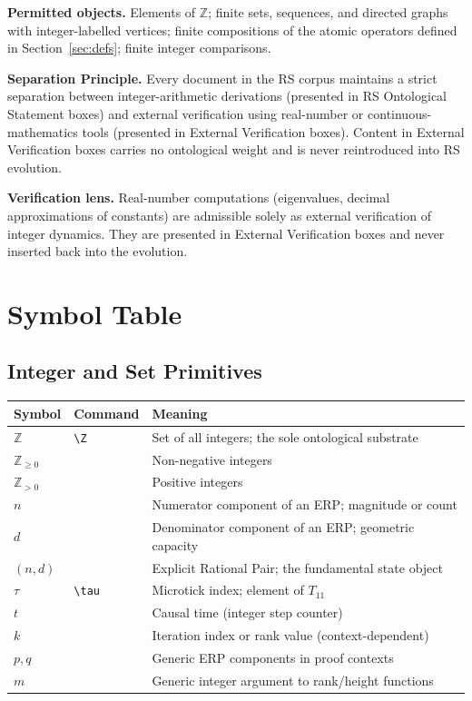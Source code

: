 \documentclass[11pt, letterpaper]{article}
\newcommand{\Z}{\mathbb{Z}}
\newcommand{\Tcyc}{T_{11}}
\theoremstyle{definition}
\theoremstyle{plain}
\begin{document}
\medskip
\noindent\textbf{Permitted objects.}
Elements of $\Z$; finite sets, sequences, and directed graphs with
integer-labelled vertices; finite compositions of the atomic operators defined
in Section~\ref{sec:defs}; finite integer comparisons.

\medskip
\noindent\textbf{Separation Principle.}
Every document in the RS corpus maintains a strict separation between
integer-arithmetic derivations (presented in RS Ontological Statement
boxes) and external verification using real-number or continuous-mathematics
tools (presented in External Verification boxes).  Content in
External Verification boxes carries no ontological weight and is never
reintroduced into RS evolution.

\medskip
\noindent\textbf{Verification lens.}
Real-number computations (eigenvalues, decimal approximations of constants)
are admissible solely as external verification of integer dynamics.  They are
presented in External Verification boxes and never inserted back into
the evolution.

\newpage


\section{Symbol Table}\label{sec:symboltable}

\subsection{Integer and Set Primitives}

\begin{longtable}{L{2.0cm} L{2.6cm} L{8.5cm}}
\toprule
\textbf{Symbol} & \textbf{Command} & \textbf{Meaning} \\
\midrule\endhead\bottomrule\endfoot

$\Z$ & \verb|\Z| & Set of all integers; the sole ontological substrate \\[3pt]
$\Z_{\geq 0}$ & & Non-negative integers \\[3pt]
$\Z_{>0}$ & & Positive integers \\[3pt]
$n$ & & Numerator component of an ERP; magnitude or count \\[3pt]
$d$ & & Denominator component of an ERP; geometric capacity \\[3pt]
$(n,d)$ & & Explicit Rational Pair; the fundamental state object \\[3pt]
$\tau$ & \verb|\tau| & Microtick index; element of $\Tcyc$ \\[3pt]
$t$ & & Causal time (integer step counter) \\[3pt]
$k$ & & Iteration index or rank value (context-dependent) \\[3pt]
$p,q$ & & Generic ERP components in proof contexts \\[3pt]
$m$ & & Generic integer argument to rank/height functions \\[3pt]
\end{longtable}
\end{document}

